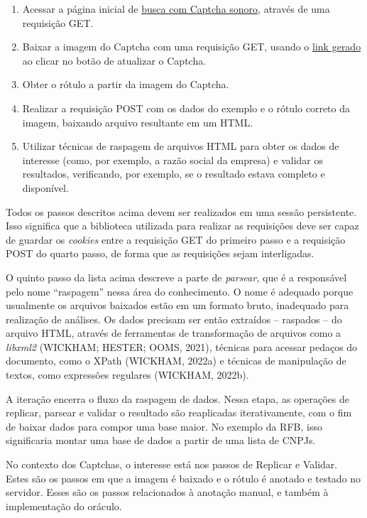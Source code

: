 \documentclass[12pt,twoside,brazilian]{book}
\providecommand{\tightlist}{%
  \setlength{\itemsep}{0pt}\setlength{\parskip}{0pt}}
\begin{document}
\begin{enumerate}
\def\labelenumi{\arabic{enumi}.}
\tightlist
\item
  Acessar a página inicial de
  \href{http://servicos.receita.fazenda.gov.br/Servicos/cnpjreva/Cnpjreva_Solicitacao_CS.asp}{busca
  com Captcha sonoro}, através de uma requisição GET.
\item
  Baixar a imagem do Captcha com uma requisição GET, usando o
  \href{http://servicos.receita.fazenda.gov.br/Servicos/cnpjreva/captcha/gerarCaptcha.asp}{link
  gerado} ao clicar no botão de atualizar o Captcha.
\item
  Obter o rótulo a partir da imagem do Captcha.
\item
  Realizar a requisição POST com os dados do exemplo e o rótulo correto
  da imagem, baixando arquivo resultante em um HTML.
\item
  Utilizar técnicas de raspagem de arquivos HTML para obter os dados de
  interesse (como, por exemplo, a razão social da empresa) e validar os
  resultados, verificando, por exemplo, se o resultado estava completo e
  disponível.
\end{enumerate}

Todos os passos descritos acima devem ser realizados em uma sessão
persistente. Isso significa que a biblioteca utilizada para realizar as
requisições deve ser capaz de guardar os \emph{cookies} entre a
requisição GET do primeiro passo e a requisição POST do quarto passo, de
forma que as requisições sejam interligadas.

O quinto passo da lista acima descreve a parte de \emph{parsear,} que é
a responsável pelo nome ``raspagem'' nessa área do conhecimento. O nome
é adequado porque usualmente os arquivos baixados estão em um formato
bruto, inadequado para realização de análises. Os dados precisam ser
então extraídos -- raspados -- do arquivo HTML, através de ferramentas
de transformação de arquivos como a \emph{libxml2} (WICKHAM; HESTER;
OOMS, 2021), técnicas para acessar pedaços do documento, como o XPath
(WICKHAM, 2022a) e técnicas de manipulação de textos, como expressões
regulares (WICKHAM, 2022b).

A iteração encerra o fluxo da raspagem de dados. Nessa etapa, as
operações de replicar, parsear e validar o resultado são reaplicadas
iterativamente, com o fim de baixar dados para compor uma base maior. No
exemplo da RFB, isso significaria montar uma base de dados a partir de
uma lista de CNPJs.

No contexto dos Captchas, o interesse está nos passos de Replicar e
Validar. Estes são os passos em que a imagem é baixado e o rótulo é
anotado e testado no servidor. Esses são os passos relacionados à
anotação manual, e também à implementação do oráculo.
\end{document}
